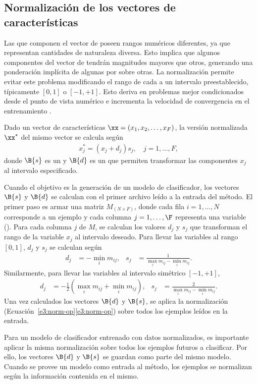 %
%
%
\subsection{Normalización de los vectores de características}
%
Las  que componen el vector de  poseen rangos
numéricos diferentes, ya que representan cantidades de naturaleza
diversa.
Esto implica que algunos componentes del vector de  tendrán
magnitudes mayores que otros, generando una ponderación implícita de
algunas  por sobre otras.
La normalización permite evitar este problema modificando el rango de
cada \caract{} a un intervalo preestablecido, típicamente $[0,1]$ o
$[-1,+1]$.
Esto deriva en problemas mejor condicionados desde el punto de vista
numérico e incrementa la velocidad de convergencia en el
entrenamiento \cite{nnfaq2}.

Dado un vector de características $\xx=(x_{1},x_{2},\ldots,x_{F})$, la
versión normalizada $\xx^*$ del mismo vector se calcula según
%
\begin{align}
  \label{e3:norm-op}
  x_j^{*} = ( x_j + d_j ) s_j, \quad j=1,\ldots,F,
\end{align}
%
donde $\B{s}$ es un  y $\B{d}$ es un  que permiten transformar las componentes $x_j$ al
intervalo especificado.

Cuando el objetivo es la generación de un modelo de clasificador, los
vectores $\B{s}$ y $\B{d}$ se calculan con el primer archivo leído a
la entrada del método.
El primer paso es armar una matriz
$M{}_{({N}\times{}F)}$, donde cada fila $i=1,\ldots,N$ corresponde a
un ejemplo y cada columna $j=1,\ldots,\F$ representa una variable
(\caract{}).
Para cada columna $j$ de $M$, se calculan los valores $d_j$ y $s_j$
que transforman el rango de la variable $x_j$ al intervalo deseado.
Para llevar las variables al rango $[0,1]$, $d_j$ y $s_j$ se
calculan según
%
\begin{align}
  d_j &= - \min_i m_{ij}, &
  s_j &= \frac{1}{\max_i m_{ij} - \min_i m_{ij}}.
\end{align}
%
Similarmente, para llevar las variables al intervalo simétrico
$[-1,+1]$,
%
\begin{align}
  d_j &= -\frac{1}{2}\left(\max_i m_{ij} + \min_i m_{ij}\right), &
  s_j &= \frac{2}{\max_i m_{ij} - \min_i m_{ij}}.
\end{align}
%
Una vez calculados los vectores $\B{d}$ y $\B{s}$, se aplica la
normalización (\iflatexml{}Ecuación~\ref{e3:norm-op}\else\autoref{e3:norm-op}\fi)
sobre todos los ejemplos leídos en la entrada.

Para un modelo de clasificador entrenado con datos normalizados, es
importante aplicar la misma normalización sobre todos los ejemplos
futuros a clasificar.
Por ello, los vectores $\B{d}$ y $\B{s}$ se guardan como parte del
mismo modelo.
Cuando se provee un modelo como entrada al método, los ejemplos se
normalizan según la información contenida en el mismo.
